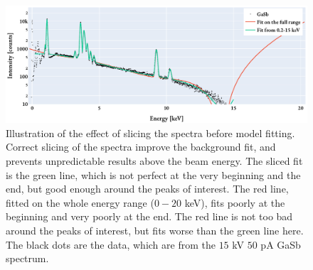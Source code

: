 \begin{figure}[htbp]
    \centering
    \includegraphics[width=0.85\linewidth]{figures/discussion/model_slicing_fit.pdf}
    \caption{
        Illustration of the effect of slicing the spectra before model fitting.
        Correct slicing of the spectra improve the background fit, and prevents unpredictable results above the beam energy.
        The sliced fit is the green line, which is not perfect at the very beginning and the end, but good enough around the peaks of interest.
        The red line, fitted on the whole energy range ($0-20$ keV), fits poorly at the beginning and very poorly at the end.
        The red line is not too bad around the peaks of interest, but fits worse than the green line here.
        The black dots are the data, which are from the $15$ kV $50$ pA GaSb spectrum.
    }
    \label{fig:discussion:model_slicing_fit}
\end{figure}



